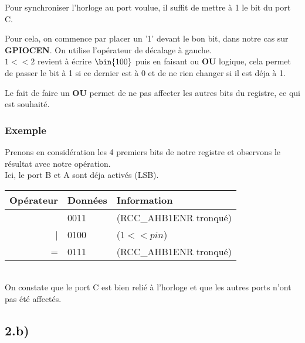 \documentclass[12pt]{report}
\renewcommand{\bold}[1]{\textbf{#1}}
\begin{document}
Pour synchroniser l'horloge au port voulue, il suffit de mettre à 1 le bit du port C.

Pour cela, on commence par placer un '1' devant le bon bit, dans notre cas sur \bold{GPIOCEN}. On utilise l'opérateur de décalage à gauche.\\



$1 << 2$ revient à écrire $\bin{100}$ puis en faisant ou \bold{OU} logique, cela permet de passer le bit à 1 si ce dernier est à 0 et de ne rien changer si il est déja à 1.


Le fait de faire un \bold{OU} permet de ne pas affecter les autres bits du registre, ce qui est souhaité. 

\subsubsection{Exemple}
Prenons en considération les 4 premiers bits de notre registre  et observons le résultat avec notre opération.\\
Ici, le port B et A sont déja activés (LSB).\\

\begin{tabular}{rl|l}
  Opérateur & Données & Information \\
\hline
    & 0011 & (RCC\_AHB1ENR tronqué)\\
   | & 0100 & ($1 << pin$)\\
   \hline
   = & 0111 & (RCC\_AHB1ENR tronqué)\\
  
\end{tabular} \\

On constate que le port C est bien relié à l'horloge et que les autres ports n'ont pas été affectés.

\subsection{2.b)}
\end{document}
